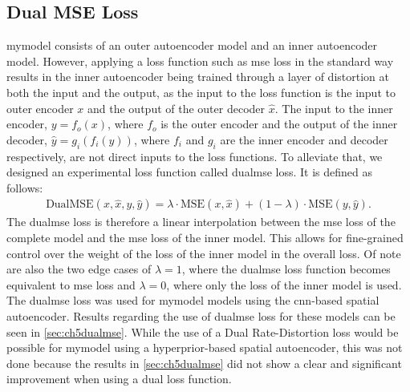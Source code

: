 \subsection{Dual MSE Loss}
\ac{mymodel} consists of an outer autoencoder model and an inner autoencoder model. However, applying a loss function such as \ac{mse} loss in the standard way results in the inner autoencoder being trained through a layer of distortion at both the input and the output, as the input to the loss function is the input to outer encoder $x$ and the output of the outer decoder $\hat{x}$. The input to the inner encoder, $y=f_o(x)$, where $f_o$ is the outer encoder and the output of the inner decoder, $\hat{y}=g_i(f_i(y))$, where $f_i$ and $g_i$ are the inner encoder and decoder respectively, are not direct inputs to the loss functions. To alleviate that, we designed an experimental loss function called \ac{dualmse} loss. It is defined as follows:
\begin{align}
\text{DualMSE}(x,\hat{x},y,\hat{y}) = \lambda \cdot \text{MSE}(x,\hat{x}) + (1-\lambda) \cdot  \text{MSE}(y,\hat{y}).
\end{align}
The \ac{dualmse} loss is therefore a linear interpolation between the \ac{mse} loss of the complete model and the \ac{mse} loss of the inner model. This allows for fine-grained control over the weight of the loss of the inner model in the overall loss. Of note are also the two edge cases of $\lambda = 1$, where the \ac{dualmse} loss function becomes equivalent to \ac{mse} loss and $\lambda = 0$, where only the loss of the inner model is used. The \ac{dualmse} loss was used for \ac{mymodel} models using the \ac{cnn}-based spatial autoencoder. Results regarding the use of \ac{dualmse} loss for these models can be seen in \autoref{sec:ch5dualmse}. While the use of a Dual Rate-Distortion loss would be possible for \ac{mymodel} using a hyperprior-based spatial autoencoder, this was not done because the results in \autoref{sec:ch5dualmse} did not show a clear and significant improvement when using a dual loss function.

